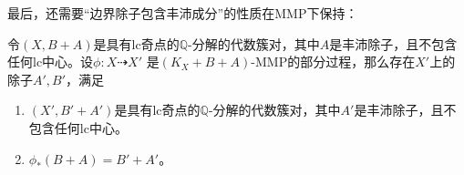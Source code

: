 

最后，还需要``边界除子包含丰沛成分''的性质在MMP下保持：
\begin{lemma}\cite[Lemma 4.3]{tx23}
 令$(X,B+A)$是具有lc奇点的$\mathbb{Q}$-分解的代数簇对，其中$A$是丰沛除子，且不包含任何lc中心。设$\phi:X \dashrightarrow X' $ 是$(K_{X}+B+A)$-MMP的部分过程，那么存在$X'$上的除子$A',B'$，满足
 \begin{enumerate}
   \item $(X',B'+A')$是具有lc奇点的$\mathbb{Q}$-分解的代数簇对，其中$A'$是丰沛除子，且不包含任何lc中心。
   \item $\phi_{*}(B+A)=B'+A'$。
 \end{enumerate}
\end{lemma}
